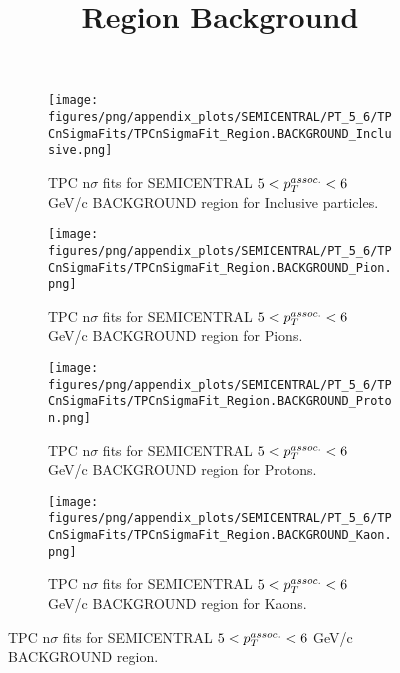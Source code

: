             \begin{figure}[H]
                \title{Region Background}
                \begin{subfigure}[b]{0.5\textwidth}
                    \centering
                    \texttt{[image: figures/png/appendix\_plots/SEMICENTRAL/PT\_5\_6/TPCnSigmaFits/TPCnSigmaFit\_Region.BACKGROUND\_Inclusive.png]}
                    \caption{TPC n$\sigma$ fits for SEMICENTRAL $5 < \pTassoc < 6$ GeV/c BACKGROUND region for Inclusive particles.}
                    \label{fig:appendix_SEMICENTRAL_$5 < \pTassoc < 6$ GeV/c_BACKGROUND_Inclusive}
                \end{subfigure}
                \begin{subfigure}[b]{0.5\textwidth}
                    \centering
                    \texttt{[image: figures/png/appendix\_plots/SEMICENTRAL/PT\_5\_6/TPCnSigmaFits/TPCnSigmaFit\_Region.BACKGROUND\_Pion.png]}
                    \caption{TPC n$\sigma$ fits for SEMICENTRAL $5 < \pTassoc < 6$ GeV/c BACKGROUND region for Pions.}
                    \label{fig:appendix_SEMICENTRAL_$5 < \pTassoc < 6$ GeV/c_BACKGROUND_Pion}
                \end{subfigure}
                \begin{subfigure}[b]{0.5\textwidth}
                    \centering
                    \texttt{[image: figures/png/appendix\_plots/SEMICENTRAL/PT\_5\_6/TPCnSigmaFits/TPCnSigmaFit\_Region.BACKGROUND\_Proton.png]}
                    \caption{TPC n$\sigma$ fits for SEMICENTRAL $5 < \pTassoc < 6$ GeV/c BACKGROUND region for Protons.}
                    \label{fig:appendix_SEMICENTRAL_$5 < \pTassoc < 6$ GeV/c_BACKGROUND_Proton}
                \end{subfigure}
                \begin{subfigure}[b]{0.5\textwidth}
                    \centering
                    \texttt{[image: figures/png/appendix\_plots/SEMICENTRAL/PT\_5\_6/TPCnSigmaFits/TPCnSigmaFit\_Region.BACKGROUND\_Kaon.png]}
                    \caption{TPC n$\sigma$ fits for SEMICENTRAL $5 < \pTassoc < 6$ GeV/c BACKGROUND region for Kaons.}
                    \label{fig:appendix_SEMICENTRAL_$5 < \pTassoc < 6$ GeV/c_BACKGROUND_Kaon}
                \end{subfigure}
                \caption{TPC n$\sigma$ fits for SEMICENTRAL $5 < \pTassoc < 6$ GeV/c BACKGROUND region.}
                \label{fig:appendix_SEMICENTRAL_$5 < \pTassoc < 6$ GeV/c_BACKGROUND}
            \end{figure}
            \clearpage
            

